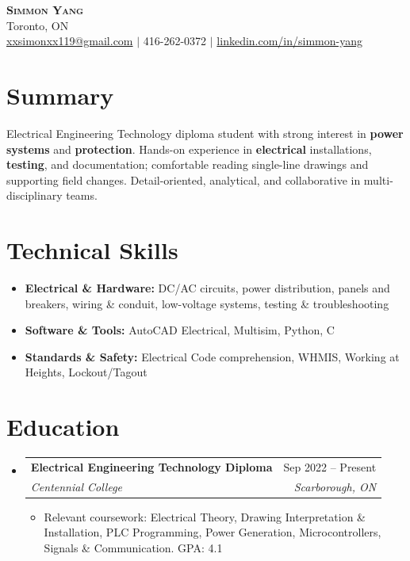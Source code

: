 \documentclass[letterpaper,11pt]{article}
\makeatletter
\newcommand{\resumeItem}[1]{\item\small{{#1 \vspace{-2pt}}}}
\newcommand{\resumeSubheading}[4]{
  \vspace{-4pt}\item
    \begin{tabular*}{0.97\textwidth}[t]{l@{\extracolsep{\fill}}r}
      \textbf{#1} & #2 \\
      \textit{\small #3} & \textit{\small #4} \\
    \end{tabular*}\vspace{-8pt}
}
\newcommand{\resumeSubHeadingListStart}{\begin{itemize}[leftmargin=0.15in, label={}]}
\newcommand{\resumeSubHeadingListEnd}{\end{itemize}}
\newcommand{\resumeItemListStart}{\begin{itemize}}
\newcommand{\resumeItemListEnd}{\end{itemize}\vspace{-5pt}}
\makeatother
\begin{document}
\begin{center}
    \textbf{\Huge \scshape Simmon Yang} \\ \vspace{1pt}
    Toronto, ON \\ 
    \href{mailto:xxsimonxx119@gmail.com}{xxsimonxx119@gmail.com} $|$ 416-262-0372 $|$ 
    \href{https://www.linkedin.com/in/simmon-yang/}{linkedin.com/in/simmon-yang}
\end{center}

\section{Summary}
Electrical Engineering Technology diploma student with strong interest in \textbf{power systems} and \textbf{protection}. Hands-on experience in \textbf{electrical} installations, \textbf{testing}, and documentation; comfortable reading single-line drawings and supporting field changes. Detail-oriented, analytical, and collaborative in multi-disciplinary teams.

\section{Technical Skills}
\begin{itemize}[leftmargin=0.15in]
  \item \textbf{Electrical \& Hardware:} DC/AC circuits, power distribution, panels and breakers, wiring \& conduit, low-voltage systems, testing \& troubleshooting
  \item \textbf{Software \& Tools:} AutoCAD Electrical, Multisim, Python, C
  \item \textbf{Standards \& Safety:} Electrical Code comprehension, WHMIS, Working at Heights, Lockout/Tagout
\end{itemize}

\section{Education}
\resumeSubHeadingListStart
\resumeSubheading
  {Electrical Engineering Technology Diploma}{Sep 2022 -- Present}
  {Centennial College}{Scarborough, ON}
\resumeItemListStart
  \resumeItem{Relevant coursework: Electrical Theory, Drawing Interpretation \& Installation, PLC Programming, Power Generation, Microcontrollers, Signals \& Communication. GPA: 4.1}
\resumeItemListEnd
\resumeSubHeadingListEnd
\end{document}
